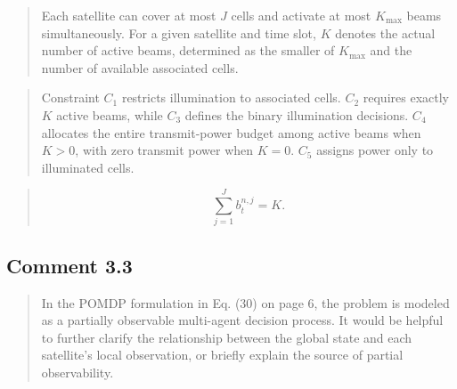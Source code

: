 \documentclass[11pt,a4paper]{article}
\begin{document}
\begin{quote}\small\color{revisionblue}
Each satellite can cover at most $J$ cells and activate at most $K_{\max}$ beams simultaneously. For a given satellite and time slot, $K$ denotes the actual number of active beams, determined as the smaller of $K_{\max}$ and the number of available associated cells.
\par
\end{quote}


\begin{quote}\small\color{revisionblue}
Constraint $C_1$ restricts illumination to associated cells. $C_2$ requires exactly $K$ active beams, while $C_3$ defines the binary illumination decisions. $C_4$ allocates the entire transmit-power budget among active beams when $K>0$, with zero transmit power when $K=0$. $C_5$ assigns power only to illuminated cells.
\par
\end{quote}


\begin{quote}\small\color{revisionblue}
\begin{equation*}
\sum_{j=1}^{J} b_t^{n,j}=K.
\tag{43}\end{equation*}
\end{quote}


\subsection*{Comment 3.3}

\begin{quote}\small In the POMDP formulation in Eq. (30) on page 6, the problem is modeled as a partially observable multi-agent decision process. It would be helpful to further clarify the relationship between the global state and each satellite’s local observation, or briefly explain the source of partial observability.\end{quote}
\end{document}
